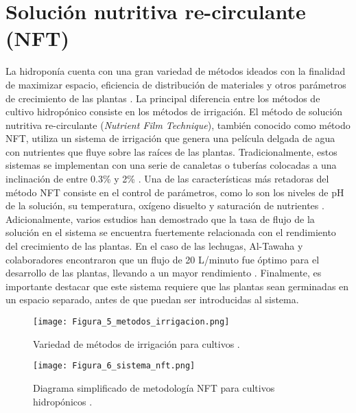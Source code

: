 \section{Solución nutritiva re-circulante (NFT)}
La hidroponía cuenta con una gran variedad de métodos ideados con la finalidad de maximizar espacio, eficiencia de distribución de materiales y otros parámetros de crecimiento de las plantas \cite{rajaseger_hydroponics_2023}. La principal diferencia entre los métodos de cultivo hidropónico consiste en los métodos de irrigación. El método de solución nutritiva re-circulante (\textit{Nutrient Film Technique}), también conocido como método NFT, utiliza un sistema de irrigación que genera una película delgada de agua con nutrientes que fluye sobre las raíces de las plantas. Tradicionalmente, estos sistemas se implementan con una serie de canaletas o tuberías colocadas a una inclinación de entre 0.3\% y 2\% \cite{van_os_technical_2019}. Una de las características más retadoras del método NFT consiste en el control de parámetros, como lo son los niveles de pH de la solución, su temperatura, oxígeno disuelto y saturación de nutrientes \cite{baiyin_flow_rate_2021}. Adicionalmente, varios estudios han demostrado que la tasa de flujo de la solución en el sistema se encuentra fuertemente relacionada con el rendimiento del crecimiento de las plantas. En el caso de las lechugas, Al-Tawaha y colaboradores encontraron que un flujo de 20 L/minuto fue óptimo para el desarrollo de las plantas, llevando a un mayor rendimiento \cite{al-tawaha_flow_rate_nft_2018}. Finalmente, es importante destacar que este sistema requiere que las plantas sean germinadas en un espacio separado, antes de que puedan ser introducidas al sistema.

\begin{figure}[H]
	\centering
	\texttt{[image: Figura\_5\_metodos\_irrigacion.png]}
	\caption{Variedad de métodos de irrigación para cultivos \cite{van_os_technical_2019}.}
	\label{fig:mesh5}
\end{figure}

\begin{figure}[H]
	\centering
	\texttt{[image: Figura\_6\_sistema\_nft.png]}
	\caption{Diagrama simplificado de metodología NFT para cultivos hidropónicos \cite{NutrientFilmTechnique_2023}.}
	\label{fig:mesh6}
\end{figure}

